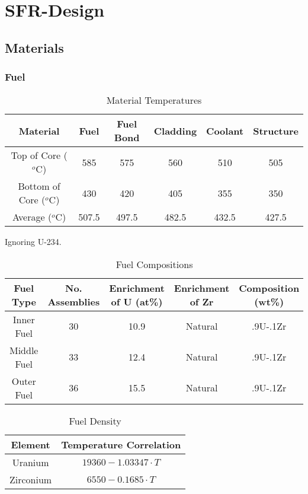 \documentclass[11pt]{article}
\newcommand{\cel}{$^o$C}
\begin{document}
\section{SFR-Design}

\subsection{Materials}
\subsubsection{Fuel}

\begin{table}[htbp]
    \centering
    \caption{Material Temperatures}
    \begin{tabular}{cccccc}
        \bottomrule
        Material & Fuel & Fuel Bond & Cladding & Coolant & Structure\\
        \toprule
        \bottomrule
        Top of Core (\cel) & 585 & 575 & 560 & 510 & 505 \\
        Bottom of Core (\cel) & 430 & 420 & 405 & 355 & 350\\
        \toprule
        \bottomrule
        Average (\cel) & 507.5 & 497.5 & 482.5 & 432.5 & 427.5\\
        \toprule
    \end{tabular}
\end{table}

Ignoring U-234.

\begin{table}[htbp]
    \centering
    \caption{Fuel Compositions}
    \begin{tabular}{ccccc}
        \bottomrule
        Fuel Type & No. Assemblies & Enrichment of U (at\%) & Enrichment of Zr & Composition (wt\%)\\
        \toprule
        \bottomrule
        Inner Fuel & 30 & 10.9 & Natural & .9U-.1Zr \\
        Middle Fuel & 33 & 12.4 & Natural & .9U-.1Zr \\
        Outer Fuel & 36 & 15.5 & Natural & .9U-.1Zr \\
        \toprule
    \end{tabular}
\end{table}

\begin{table}[htbp]
    \centering
    \caption{Fuel Density}
    \begin{tabular}{cc}
        \bottomrule
        Element & Temperature Correlation \\
        \toprule
        \bottomrule
        Uranium & $19360-1.03347\cdot T$\\
        Zirconium & $6550 - 0.1685\cdot T$\\
        \toprule
    \end{tabular}
\end{table}
\end{document}
